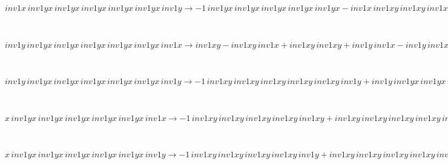 \documentclass[rep10,leqno]{report}
\begin{document}
\begin{minipage}{6in}
$
inv1x\,
 inv1yx\,
 inv1yx\,
 inv1yx\,
 inv1yx\,
 inv1yx\,
 inv1y\rightarrow -1\,
 inv1yx\,
 inv1yx\,
 inv1yx\,
 inv1yx\,
 inv1yx - inv1x\,
 inv1xy\,
 inv1xy\,
 inv1xy\,
 inv1xy\,
 inv1y + inv1x\,
 inv1yx\,
 inv1yx\,
 inv1yx\,
 inv1yx\,
 inv1yx + inv1yx\,
 inv1yx\,
 inv1yx\,
 inv1yx\,
 inv1yx\,
 inv1y + inv1x\,
 inv1xy\,
 inv1xy\,
 inv1xy\,
 inv1xy\,
 inv1xy\,
 inv1y
$
\end{minipage}\medskip \\
\begin{minipage}{6in}
$
inv1y\,
 inv1yx\,
 inv1yx\,
 inv1yx\,
 inv1yx\,
 inv1yx\,
 inv1x\rightarrow inv1xy - inv1xy\,
 inv1x + inv1xy\,
 inv1xy + inv1y\,
 inv1x - inv1y\,
 inv1xy - inv1xy\,
 inv1xy\,
 inv1x + inv1xy\,
 inv1xy\,
 inv1xy + inv1y\,
 inv1xy\,
 inv1x - inv1y\,
 inv1xy\,
 inv1xy - inv1xy\,
 inv1xy\,
 inv1xy\,
 inv1x + inv1xy\,
 inv1xy\,
 inv1xy\,
 inv1xy + inv1y\,
 inv1xy\,
 inv1xy\,
 inv1x - inv1y\,
 inv1xy\,
 inv1xy\,
 inv1xy - inv1xy\,
 inv1xy\,
 inv1xy\,
 inv1xy\,
 inv1x + inv1xy\,
 inv1xy\,
 inv1xy\,
 inv1xy\,
 inv1xy + inv1y\,
 inv1xy\,
 inv1xy\,
 inv1xy\,
 inv1x - inv1y\,
 inv1xy\,
 inv1xy\,
 inv1xy\,
 inv1xy - inv1xy\,
 inv1xy\,
 inv1xy\,
 inv1xy\,
 inv1xy\,
 inv1x + inv1y\,
 inv1xy\,
 inv1xy\,
 inv1xy\,
 inv1xy\,
 inv1x - inv1y\,
 inv1xy\,
 inv1xy\,
 inv1xy\,
 inv1xy\,
 inv1xy + inv1y\,
 inv1xy\,
 inv1xy\,
 inv1xy\,
 inv1xy\,
 inv1xy\,
 inv1x
$
\end{minipage}\medskip \\
\begin{minipage}{6in}
$
inv1y\,
 inv1yx\,
 inv1yx\,
 inv1yx\,
 inv1yx\,
 inv1yx\,
 inv1y\rightarrow -1\,
 inv1xy\,
 inv1xy\,
 inv1xy\,
 inv1xy\,
 inv1xy\,
 inv1y + inv1y\,
 inv1yx\,
 inv1yx\,
 inv1yx\,
 inv1yx\,
 inv1yx + inv1y\,
 inv1xy\,
 inv1xy\,
 inv1xy\,
 inv1xy\,
 inv1xy\,
 inv1y
$
\end{minipage}\medskip \\
\begin{minipage}{6in}
$
x\,
 inv1yx\,
 inv1yx\,
 inv1yx\,
 inv1yx\,
 inv1yx\,
 inv1x\rightarrow -1\,
 inv1xy\,
 inv1xy\,
 inv1xy\,
 inv1xy\,
 inv1xy + inv1xy\,
 inv1xy\,
 inv1xy\,
 inv1xy\,
 inv1xy\,
 inv1x
$
\end{minipage}\medskip \\
\begin{minipage}{6in}
$
x\,
 inv1yx\,
 inv1yx\,
 inv1yx\,
 inv1yx\,
 inv1yx\,
 inv1y\rightarrow -1\,
 inv1xy\,
 inv1xy\,
 inv1xy\,
 inv1xy\,
 inv1y + inv1xy\,
 inv1xy\,
 inv1xy\,
 inv1xy\,
 inv1xy\,
 inv1y + x\,
 inv1yx\,
 inv1yx\,
 inv1yx\,
 inv1yx\,
 inv1yx
$
\end{minipage}\medskip \\
\end{document}
